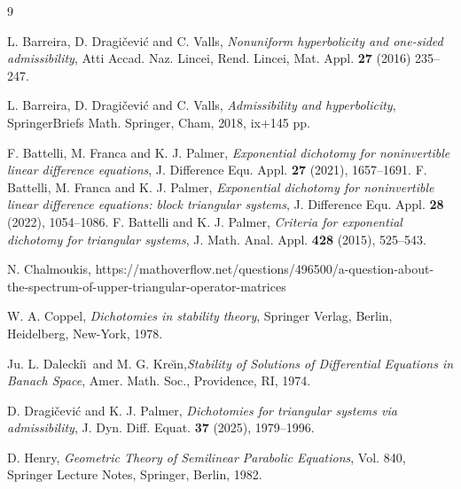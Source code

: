 \documentclass[11pt,reqno,a4paper]{amsart}
\theoremstyle{plain}
\numberwithin{equation}{section}
\theoremstyle{remark}
\begin{document}
	\begin{thebibliography}{9}


    
L. Barreira, D. Dragi\v cevi\'c and C. Valls, \emph{Nonuniform hyperbolicity and one-sided admissibility}, Atti Accad. Naz. Lincei, Rend. Lincei, Mat. Appl. \textbf{27} (2016) 235--247.

L. Barreira, D. Dragi\v cevi\' c and C. Valls, \emph{Admissibility and hyperbolicity}, SpringerBriefs Math.
Springer, Cham, 2018, ix+145 pp.

F. Battelli, M. Franca and K. J. Palmer, \emph{Exponential dichotomy for noninvertible linear
difference equations}, J. Difference Equ. Appl. \textbf{27} (2021), 1657--1691.
F. Battelli, M. Franca and K. J. Palmer, \emph{Exponential dichotomy for noninvertible linear
difference equations: block triangular systems}, J. Difference Equ. Appl. \textbf{28} (2022), 1054--1086.
 F. Battelli and K. J. Palmer, \emph{Criteria for exponential dichotomy for triangular systems}, J. Math. Anal. Appl. \textbf{428} (2015), 525--543.



 N. Chalmoukis, https://mathoverflow.net/questions/496500/a-question-about-the-spectrum-of-upper-triangular-operator-matrices

W. A.  Coppel, \emph{Dichotomies in stability theory},  Springer Verlag, Berlin, Heidelberg, New-York, 1978. 


Ju. L.  Dalecki\u \i \ and  M. G.  Kre\u \i n,\emph{Stability of Solutions of Differential Equations in Banach Space},
 Amer. Math. Soc., Providence, RI, 1974.

D. Dragi\v cevi\' c and K. J. Palmer, \emph{Dichotomies for triangular systems via admissibility}, J. Dyn. Diff. Equat. \textbf{37} (2025), 1979--1996.


D. Henry, \emph{Geometric Theory of Semilinear Parabolic Equations}, Vol. 840, Springer Lecture Notes,
Springer, Berlin, 1982.


\end{thebibliography}
\end{document}
